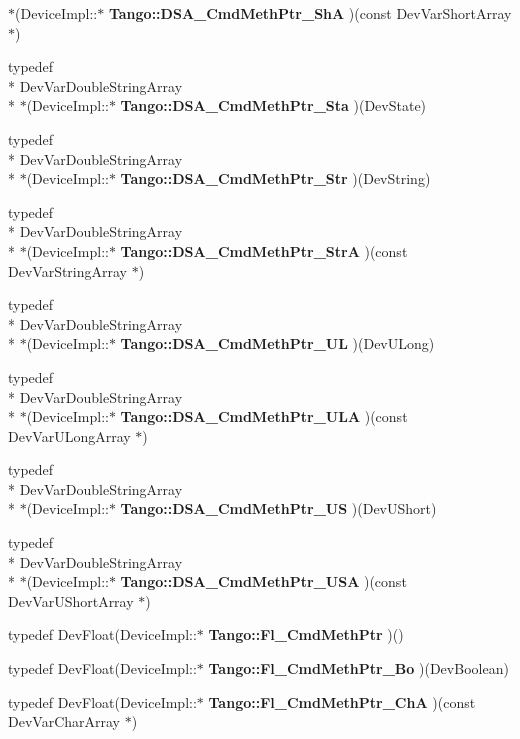 \begin{DoxyCompactItemize}
$\ast$(Device\-Impl\-::$\ast$ {\bf Tango\-::\-D\-S\-A\-\_\-\-Cmd\-Meth\-Ptr\-\_\-\-Sh\-A} )(const Dev\-Var\-Short\-Array $\ast$)
\item 
typedef \\*
Dev\-Var\-Double\-String\-Array \\*
$\ast$(Device\-Impl\-::$\ast$ {\bf Tango\-::\-D\-S\-A\-\_\-\-Cmd\-Meth\-Ptr\-\_\-\-Sta} )(Dev\-State)
\item 
typedef \\*
Dev\-Var\-Double\-String\-Array \\*
$\ast$(Device\-Impl\-::$\ast$ {\bf Tango\-::\-D\-S\-A\-\_\-\-Cmd\-Meth\-Ptr\-\_\-\-Str} )(Dev\-String)
\item 
typedef \\*
Dev\-Var\-Double\-String\-Array \\*
$\ast$(Device\-Impl\-::$\ast$ {\bf Tango\-::\-D\-S\-A\-\_\-\-Cmd\-Meth\-Ptr\-\_\-\-Str\-A} )(const Dev\-Var\-String\-Array $\ast$)
\item 
typedef \\*
Dev\-Var\-Double\-String\-Array \\*
$\ast$(Device\-Impl\-::$\ast$ {\bf Tango\-::\-D\-S\-A\-\_\-\-Cmd\-Meth\-Ptr\-\_\-\-U\-L} )(Dev\-U\-Long)
\item 
typedef \\*
Dev\-Var\-Double\-String\-Array \\*
$\ast$(Device\-Impl\-::$\ast$ {\bf Tango\-::\-D\-S\-A\-\_\-\-Cmd\-Meth\-Ptr\-\_\-\-U\-L\-A} )(const Dev\-Var\-U\-Long\-Array $\ast$)
\item 
typedef \\*
Dev\-Var\-Double\-String\-Array \\*
$\ast$(Device\-Impl\-::$\ast$ {\bf Tango\-::\-D\-S\-A\-\_\-\-Cmd\-Meth\-Ptr\-\_\-\-U\-S} )(Dev\-U\-Short)
\item 
typedef \\*
Dev\-Var\-Double\-String\-Array \\*
$\ast$(Device\-Impl\-::$\ast$ {\bf Tango\-::\-D\-S\-A\-\_\-\-Cmd\-Meth\-Ptr\-\_\-\-U\-S\-A} )(const Dev\-Var\-U\-Short\-Array $\ast$)
\item 
typedef Dev\-Float(Device\-Impl\-::$\ast$ {\bf Tango\-::\-Fl\-\_\-\-Cmd\-Meth\-Ptr} )()
\item 
typedef Dev\-Float(Device\-Impl\-::$\ast$ {\bf Tango\-::\-Fl\-\_\-\-Cmd\-Meth\-Ptr\-\_\-\-Bo} )(Dev\-Boolean)
\item 
typedef Dev\-Float(Device\-Impl\-::$\ast$ {\bf Tango\-::\-Fl\-\_\-\-Cmd\-Meth\-Ptr\-\_\-\-Ch\-A} )(const Dev\-Var\-Char\-Array $\ast$)

\end{DoxyCompactItemize}
